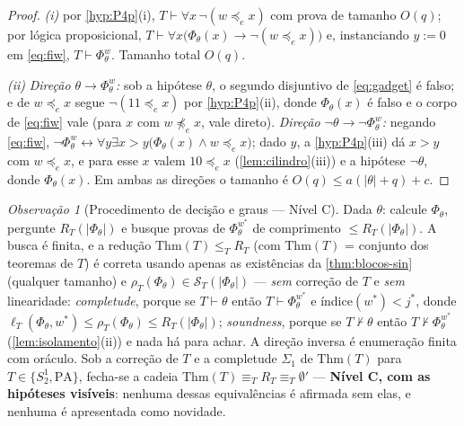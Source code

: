 \documentclass[11pt,a4paper]{article}
\theoremstyle{definition}
\theoremstyle{remark}
\newtheorem*{remark}{Observação}
\begin{document}
\begin{proof}
\emph{(i)} por \cref{hyp:P4p}(i), $T \vdash \forall x\,\neg(w \preceq_{e} x)$
com prova de tamanho $O(q)$; por lógica proposicional,
$T \vdash \forall x\bigl(\Phi_\theta(x) \rightarrow \neg(w \preceq_{e} x)\bigr)$
e, instanciando $y := 0$ em \eqref{eq:fiw}, $T \vdash \Phi_\theta^{w}$. Tamanho
total $O(q)$.

\emph{(ii)} \emph{Direção $\theta \rightarrow \Phi_\theta^{w}$:} sob a
hipótese $\theta$, o segundo disjuntivo de \eqref{eq:gadget} é falso; e de
$w \preceq_{e} x$ segue $\neg(11 \preceq_{e} x)$ por \cref{hyp:P4p}(ii),
donde $\Phi_\theta(x)$ é falso e o corpo de \eqref{eq:fiw} vale (para $x$ com
$w \not\preceq_{e} x$, vale direto). \emph{Direção
$\neg\theta \rightarrow \neg\Phi_\theta^{w}$:} negando \eqref{eq:fiw},
$\neg\Phi_\theta^{w} \leftrightarrow \forall y\exists x>y\bigl(\Phi_\theta(x)
\wedge w \preceq_{e} x\bigr)$; dado $y$, a \cref{hyp:P4p}(iii) dá $x > y$ com
$w \preceq_{e} x$, e para esse $x$ valem $10 \preceq_{e} x$
(\cref{lem:cilindro}(iii)) e a hipótese $\neg\theta$, donde $\Phi_\theta(x)$.
Em ambas as direções o tamanho é $O(q) \leq a(\lvert\theta\rvert + q) + c$.
\end{proof}

\begin{remark}[Procedimento de deci\c{s}\~{a}o e graus --- Nível C]\label{rem:graus}
Dada $\theta$: calcule $\Phi_\theta$, pergunte $R_T(\lvert\Phi_\theta\rvert)$
e busque provas de $\Phi_\theta^{w^{*}}$ de comprimento
$\leq R_T(\lvert\Phi_\theta\rvert)$. A busca é finita, e a redução
$\mathrm{Thm}(T) \leq_{T} R_T$ (com $\mathrm{Thm}(T)$ = conjunto dos teoremas
de $T$) é correta usando apenas as existências da
\cref{thm:blocos-sin} (qualquer tamanho) e
$\rho_T(\Phi_\theta) \in \mathcal{S}_T(\lvert\Phi_\theta\rvert)$ ---
\emph{sem} correção de $T$ e \emph{sem} linearidade: \emph{completude}, porque
se $T \vdash \theta$ então $T \vdash \Phi_\theta^{w^{*}}$ e
índice$(w^{*}) < j^{*}$, donde
$\ell_T(\Phi_\theta, w^{*}) \leq \rho_T(\Phi_\theta)
\leq R_T(\lvert\Phi_\theta\rvert)$; \emph{soundness}, porque se
$T \nvdash \theta$ então $T \nvdash \Phi_\theta^{w^{*}}$
(\cref{lem:isolamento}(ii)) e nada há para achar. A direção inversa é
enumeração finita com oráculo. Sob a correção de $T$ e a completude
$\Sigma_{1}$ de $\mathrm{Thm}(T)$ para $T \in \{S^{1}_{2}, \mathrm{PA}\}$,
fecha-se a cadeia $\mathrm{Thm}(T) \equiv_{T} R_T \equiv_{T} \emptyset'$
--- \textbf{Nível C, com as hipóteses visíveis}: nenhuma dessas equivalências
é afirmada sem elas, e nenhuma é apresentada como novidade.
\end{remark}
\end{document}
